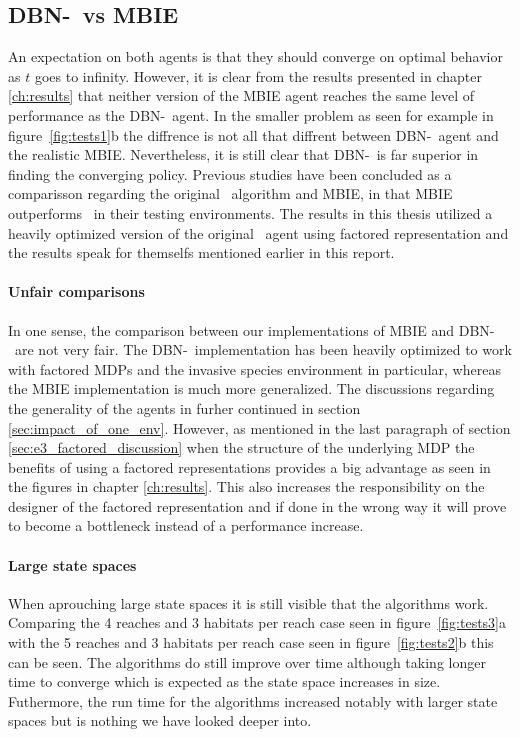 \subsection{DBN-\etre\ vs MBIE }
An expectation on both agents is that they should converge on optimal behavior as $t$ goes to infinity. However, it is clear from the results presented in chapter \ref{ch:results} that neither version of the MBIE agent reaches the same level of performance as the DBN-\etre\ agent. In the smaller problem as seen for example in figure~\ref{fig:tests1}b the diffrence is not all that diffrent between DBN-\etre\ agent and the realistic MBIE. Nevertheless, it is still clear that DBN-\etre\ is far superior in finding the converging policy. Previous studies have been concluded as a comparisson regarding the original \etre\ algorithm and MBIE, in \textcite{strehl2004empirical} that MBIE outperforms \etre\ in their testing environments. The results in this thesis utilized a heavily optimized version of the original \etre\ agent using factored representation and the results speak for themselfs mentioned earlier in this report. 

\paragraph{Unfair comparisons} In one sense, the comparison between our implementations of MBIE and DBN-\etre\ are not very fair. The DBN-\etre\ implementation has been heavily optimized to work with factored MDPs and the invasive species environment in particular, whereas the MBIE implementation is much more generalized. The discussions regarding the generality of the agents in furher continued in section \ref{sec:impact_of_one_env}. However, as mentioned in the last paragraph of section \ref{sec:e3_factored_discussion} when the structure of the underlying MDP the benefits of using a factored representations provides a big advantage as seen in the figures in chapter \ref{ch:results}. This also increases the responsibility on the designer of the factored representation and if done in the wrong way it will prove to become a bottleneck instead of a performance increase.

\paragraph{Large state spaces}
When aprouching large state spaces it is still visible that the algorithms work. Comparing the 4 reaches and 3 habitats per reach case seen in figure~\ref{fig:tests3}a with the 5 reaches and 3 habitats per reach case seen in figure~\ref{fig:tests2}b this can be seen. The algorithms do still improve over time although taking longer time to converge which is expected as the state space increases in size. Futhermore, the run time for the algorithms increased notably with larger state spaces but is nothing we have looked deeper into.  

